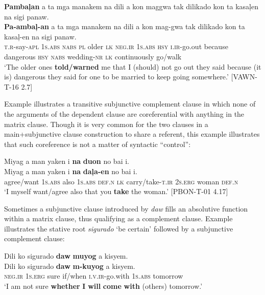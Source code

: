 \ea
\textbf{Pambaļan}  a  ta  mga  manakem  na  dili  a  kon  maggwa tak  dilikado  kon  ta  kasaļen  na  sigi  panaw. \smallskip\\
\gll \textbf{Pa-ambaļ-an}  a  ta  mga  manakem  na  dili  a  kon  mag-gwa tak  dilikado  kon  ta  kasaļ-en  na  sigi  panaw. \\
\textsc{t.r}-say-\textsc{apl}  1\textsc{s.abs}  \textsc{nabs}  \textsc{pl}  older  \textsc{lk}  \textsc{neg.ir}  1\textsc{s.abs}  \textsc{hsy}  \textsc{i.ir}-go.out
because  dangerous  \textsc{hsy}  \textsc{nabs}  wedding-\textsc{nr}  \textsc{lk}  continuously  go/walk \\
\glt `The older ones \textbf{told/warned} me that I (should) not go out they said because (it is) dangerous they said for one to be married to keep going somewhere.’ [VAWN-T-16 2.7]
\z

Example  illustrates a transitive subjunctive complement clause in which none of the arguments of the dependent clause are coreferential with anything in the matrix clause. Though it is very common for the two clauses in a main+sub\-junc\-tive clause construction to share a referent, this example illustrates that such coreference is not a matter of syntactic “control”:

\ea
\label{bkm:Ref474854233}
Miyag  a  man  yaken  i  \textbf{na}  \textbf{duon}  no  bai  i. \smallskip\\
\gll Miyag  a  man  yaken  i  \textbf{na}  \textbf{daļa-en}  no  bai  i. \\
agree/want  1\textsc{s.abs}  also  1\textsc{s.abs}  \textsc{def.n}  \textsc{lk}  carry/take-\textsc{t.ir}  2\textsc{s.erg}  woman  \textsc{def.n} \\
\glt ‘I myself want/agree also that you \textbf{take} the woman.’ [PBON-T-01 4.17]
\z

Sometimes a subjunctive clause introduced by \textit{daw} fills an absolutive function within a matrix clause, thus qualifying as a complement clause. Example  illustrates the stative root \textit{sigurado} ‘be certain’ followed by a subjunctive complement clause:

\ea
\label{bkm:Ref115872660}
Dili  ko  sigurado  \textbf{daw}  \textbf{muyog}  a  kisyem. \smallskip\\
\gll Dili  ko  sigurado  \textbf{daw}  \textbf{m-kuyog}  a  kisyem. \\
\textsc{neg.ir}  1\textsc{s.erg}  sure  if/when  \textsc{i.v.ir}-go.with  1\textsc{s.abs}  tomorrow \\
\glt ‘I am not sure \textbf{whether} \textbf{I} \textbf{will} \textbf{come} \textbf{with} (others) tomorrow.’
\z

